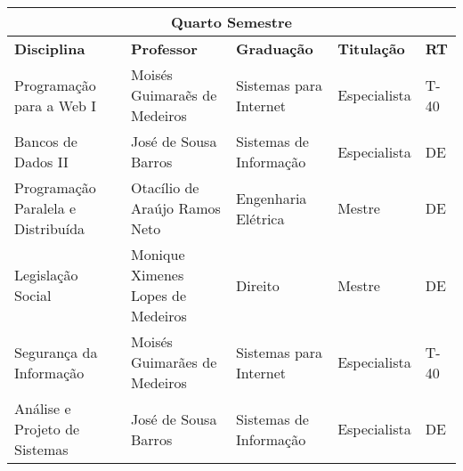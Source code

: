 \begin{table}[h!]
\scriptsize
\begin{tabular}{lllll}
\multicolumn{5}{c}{\cellcolor[HTML]{C0C0C0}\textbf{Quarto Semestre}}                                                                                                                                                                                                                                    \\ \hline
\multicolumn{1}{|p{5.2cm}|}{\cellcolor[HTML]{FFFFFF}\textbf{Disciplina}}                                    & \multicolumn{1}{p{5.2cm}|}{\textbf{Professor}}                 & \multicolumn{1}{p{3.1cm}|}{\textbf{Graduação}}     & \multicolumn{1}{p{1.7cm}|}{\textbf{Titulação}} & \multicolumn{1}{p{0.6cm}|}{\textbf{RT}} \\ \hline
\multicolumn{1}{|l|}{Programa\c{c}\~ao para a Web I}                                                            & \multicolumn{1}{l|}{Mois\'es Guimara\~es de Medeiros}             & \multicolumn{1}{l|}{Sistemas para Internet}          & \multicolumn{1}{l|}{Especialista}             & \multicolumn{1}{l|}{T-40}                          \\ \hline
\multicolumn{1}{|l|}{Bancos de Dados II} & \multicolumn{1}{l|}{Jos\'e de Sousa Barros}        & \multicolumn{1}{l|}{Sistemas de Informa\c{c}\~ao}             & \multicolumn{1}{l|}{Especialista}             & \multicolumn{1}{l|}{DE}                          \\ \hline
\multicolumn{1}{|l|}{\cellcolor[HTML]{FFFFFF}Programa\c{c}\~ao Paralela e Distribu\'ida}                         & \multicolumn{1}{l|}{Otac\'ilio de Ara\'ujo Ramos Neto}   & \multicolumn{1}{l|}{Engenharia El\'etrica}             & \multicolumn{1}{l|}{Mestre}             & \multicolumn{1}{l|}{DE}                        \\ \hline
\multicolumn{1}{|l|}{Legislação Social}                                             & \multicolumn{1}{l|}{Monique Ximenes Lopes de Medeiros}                 & \multicolumn{1}{l|}{Direito}  & \multicolumn{1}{l|}{Mestre}             & \multicolumn{1}{l|}{DE}                          \\ \hline
\multicolumn{1}{|l|}{Seguran\c{c}a da Informa\c{c}\~ao}                                                      & \multicolumn{1}{l|}{Mois\'es Guimar\~aes de Medeiros} & \multicolumn{1}{l|}{Sistemas para Internet}  & \multicolumn{1}{l|}{Especialista}             & \multicolumn{1}{l|}{T-40}                          \\ \hline
\multicolumn{1}{|l|}{An\'alise e Projeto de Sistemas}                                                         & \multicolumn{1}{l|}{Jos\'e de Sousa Barros}       & \multicolumn{1}{l|}{Sistemas de Informa\c{c}\~ao} & \multicolumn{1}{l|}{Especialista}       & \multicolumn{1}{l|}{DE}                        \\ \hline
\end{tabular}
\end{table}


